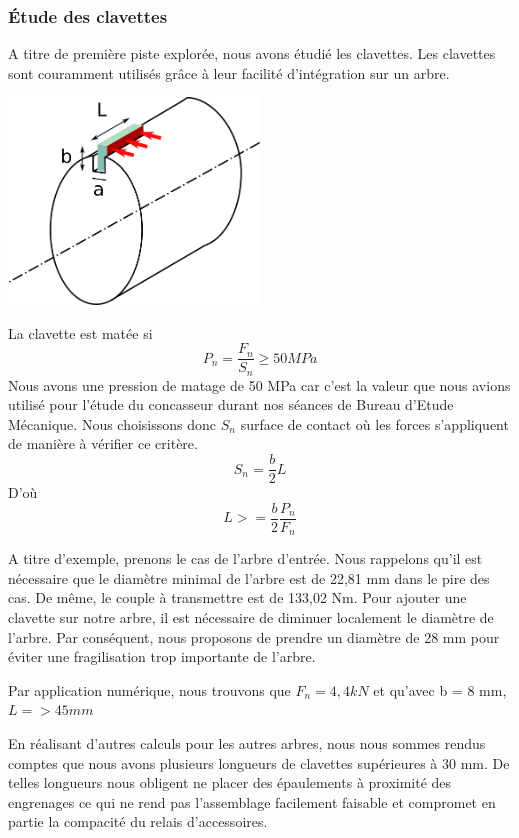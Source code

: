 \documentclass{config}
\begin{document}
\begin{spacing}{1.2}
\subsubsection{Étude des clavettes}
A titre de première piste explorée, nous avons étudié les clavettes. Les clavettes sont couramment utilisés grâce à leur facilité d'intégration sur un arbre.
\begin{center}
\includegraphics[width=0.5\textwidth]{Determination_clavette_sur_arbre.png}
\end{center}

La clavette est matée si 
\[P_n = \frac{F_n}{S_n}  \geq 50 MPa \]
Nous avons une pression de matage de 50 MPa car c'est la valeur que nous avions utilisé pour l'étude du concasseur durant nos séances de Bureau d'Etude Mécanique.
Nous choisissons donc $S_n$ surface de contact où les forces s'appliquent de manière à vérifier ce critère.
\[S_n = \frac{b}{2}L  \]
D'où  \[L>= \frac{b}{2}\frac{P_n}{F_n}\]

A titre d'exemple, prenons le cas de l'arbre d'entrée. Nous rappelons qu'il est nécessaire que le diamètre minimal de l'arbre est de 22,81 mm dans le pire des cas. De même, le couple à transmettre est de 133,02 Nm. 
Pour ajouter une clavette sur notre arbre, il est nécessaire de diminuer localement le diamètre de l'arbre. Par conséquent, nous proposons de prendre un diamètre de 28 mm pour éviter une fragilisation trop importante de l'arbre. 

Par application numérique, nous trouvons que $F_n = 4,4 kN$ et qu'avec b = 8 mm, $L => 45 mm$

En réalisant d'autres calculs pour les autres arbres, nous nous sommes rendus comptes que nous avons plusieurs longueurs de clavettes supérieures à 30 mm. De telles longueurs nous obligent ne placer des épaulements à proximité des engrenages ce qui ne rend pas l'assemblage facilement faisable et compromet en partie la compacité du relais d'accessoires.


\end{spacing}
\end{document}
